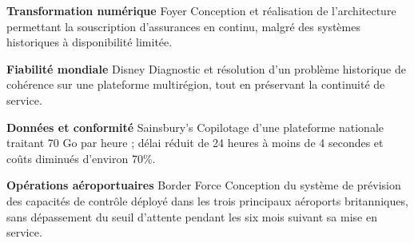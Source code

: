 
\begin{cventries}
    \cventry
    {\textbf{Transformation numérique}} %
    {Foyer} %
    {} %
    {} %
    {
         Conception et réalisation de l’architecture permettant la souscription d’assurances en continu, malgré des systèmes historiques à disponibilité limitée.
    }
%

    \cventry
    {\textbf{Fiabilité mondiale}}
    {Disney}
    {}
    {}
    {
        Diagnostic et résolution d’un problème historique de cohérence sur une plateforme multirégion, tout en préservant la continuité de service.
    }

    \cventry
    {\textbf{Données et conformité}}
    {Sainsbury’s}
    {}
    {}
    {
        Copilotage d’une plateforme nationale traitant 70 Go par heure ; délai réduit de 24 heures à moins de 4 secondes et coûts diminués d’environ 70\%.
    }

    \cventry
    {\textbf{Opérations aéroportuaires}}
    {Border Force}
    {}
    {}
    {
        Conception du système de prévision des capacités de contrôle déployé dans les trois principaux aéroports britanniques, sans dépassement du seuil d’attente pendant les six mois suivant sa mise en service.
    }



\end{cventries}
